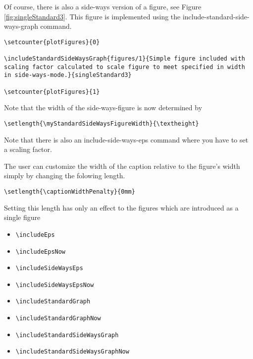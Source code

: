 \documentclass[12pt,a4paper]{article}
\begin{document}
Of course, there is also a side-ways version of a figure, see 
Figure \ref{fig:singleStandard3}. This figure is implemented using
the include-standard-side-ways-graph command. 

\begin{verbatim} 
\setcounter{plotFigures}{0} 

\includeStandardSideWaysGraph{figures/1}{Simple figure included with 
scaling factor calculated to scale figure to meet specified in width 
in side-ways-mode.}{singleStandard3} 

\setcounter{plotFigures}{1} 
\end{verbatim}

\setcounter{plotFigures}{0} 
\setcounter{plotFigures}{1} 

Note that the width of the side-ways-figure is now determined by

\begin{verbatim} 
\setlength{\myStandardSideWaysFigureWidth}{\textheight}
\end{verbatim}

Note that there is also an include-side-ways-eps command where 
you have to set a scaling factor.

The user can customize the width of the caption relative to the figure's width
simply by changing the folowing length.

\begin{verbatim}
\setlength{\captionWidthPenalty}{0mm}
\end{verbatim}

Setting this length has only an effect to the figures which are introduced as a single
figure

\begin{itemize}
  \item \verb+\includeEps+
  \item \verb+\includeEpsNow+
  \item \verb+\includeSideWaysEps+
  \item \verb+\includeSideWaysEpsNow+
  \item \verb+\includeStandardGraph+
  \item \verb+\includeStandardGraphNow+
  \item \verb+\includeStandardSideWaysGraph+
  \item \verb+\includeStandardSideWaysGraphNow+
\end{itemize}
\end{document}

